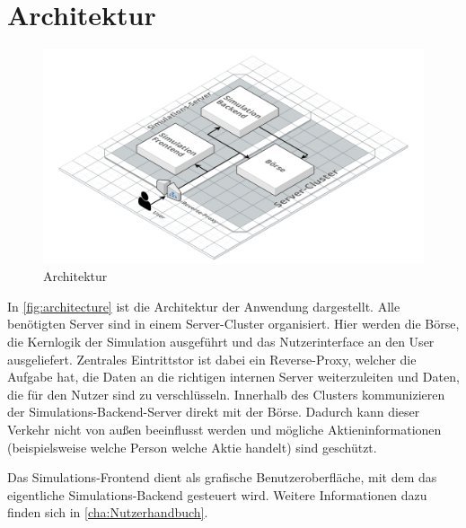 \section{Architektur}\label{sec:Architektur}
\begin{figure}[ht]
    \includegraphics[width=\textwidth]{img/architecture.png}
    \centering
    \caption{Architektur}
    \label{fig:architecture}
\end{figure}

In \autoref{fig:architecture} ist die Architektur der Anwendung dargestellt.
Alle benötigten Server sind in einem Server-Cluster organisiert.
Hier werden die Börse, die Kernlogik der Simulation ausgeführt und das Nutzerinterface an den User ausgeliefert. Zentrales Eintrittstor ist dabei ein Reverse-Proxy, welcher die Aufgabe hat, die Daten an die richtigen internen Server weiterzuleiten und Daten, die für den Nutzer sind zu verschlüsseln.
Innerhalb des Clusters kommunizieren der Simulations-Backend-Server direkt mit der Börse. Dadurch kann dieser Verkehr nicht von außen beeinflusst werden und mögliche Aktieninformationen (beispielsweise welche Person welche Aktie handelt) sind geschützt.

Das Simulations-Frontend dient als grafische Benutzeroberfläche, mit dem das eigentliche Simulations-Backend gesteuert wird. Weitere Informationen dazu finden sich in \autoref{cha:Nutzerhandbuch}.

